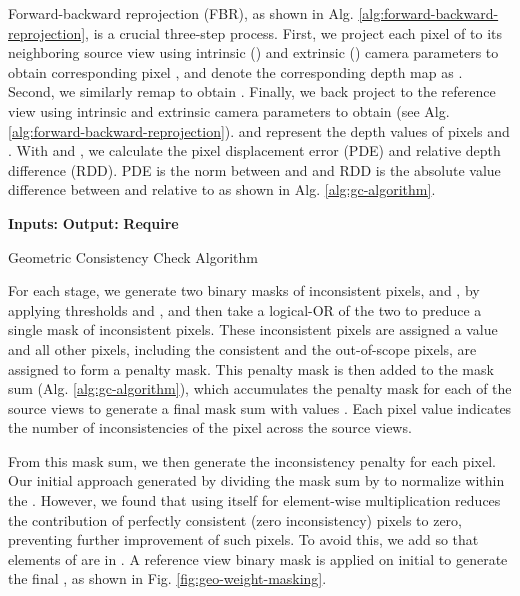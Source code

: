 \documentclass[10pt,twocolumn,letterpaper]{article}
\begin{document}
Forward-backward reprojection (FBR), as shown in Alg. \ref{alg:forward-backward-reprojection}, is a crucial three-step process. First,
we project each pixel  of  to
its  neighboring source view using intrinsic () and extrinsic () camera 
parameters to obtain corresponding pixel , and denote the corresponding depth map as . Second, we 
similarly remap  
to obtain .
Finally, 
we back project  to the reference view using intrinsic and extrinsic camera parameters 
to obtain  (see Alg. \ref{alg:forward-backward-reprojection}).  and  represent
the depth values of pixels  and
 \cite{Hartley2012Multi-view-geometry}. With 
and , we calculate the pixel displacement error (PDE)
and relative depth difference (RDD). PDE is the  norm between
 and  and RDD is the absolute value difference between
 and  relative to  as shown in Alg. \ref{alg:gc-algorithm}.


\begin{algorithm}[t]
\footnotesize
\begin{algorithmic}
    \State \textbf{Inputs:} 
    \State \textbf{Output:} 
    \State \textbf{Require} 
    \State 
    \State 
    \State 
    \State  {}
    \State 
    \State 
    \State 
    \State 
    \State 
    \If{}
        \State  \Else
        \State 
    \EndIf
    \State 
    \EndFor \\

\end{algorithmic}
\caption{Geometric Consistency Check Algorithm}
\label{alg:gc-algorithm}
\end{algorithm}




For each stage, we generate two binary masks of inconsistent pixels,  and ,
by applying thresholds
 and , and then take a logical-OR of the two to preduce a single mask
of inconsistent pixels.
These inconsistent pixels are assigned a value  and all
other pixels, including the consistent and the out-of-scope pixels,
are assigned  to form a penalty mask. This penalty mask
is then added to the mask sum (Alg. \ref{alg:gc-algorithm}),
which accumulates the penalty mask for each of the  source views to generate a final
mask sum with values .
Each pixel value indicates the number of inconsistencies of the pixel
across the  source views.

From this mask sum, we then generate the inconsistency penalty 
for each pixel. Our initial approach generated  by dividing the mask sum by 
 to normalize within the .
However, we found that using  itself for element-wise
multiplication reduces the contribution of perfectly consistent (zero
inconsistency) pixels to zero, preventing further improvement of such
pixels.  To avoid this, we add  so that elements of  are in
. A reference view binary mask is applied on initial  to
generate the final , as shown in Fig. \ref{fig:geo-weight-masking}.
\end{document}
